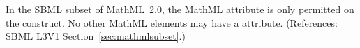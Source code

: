 In the SBML subset of MathML~2.0, the MathML attribute
 is only permitted on the  construct.
No other MathML elements may have a  attribute.
(References: SBML L3V1 Section~\ref{sec:mathmlsubset}.)
